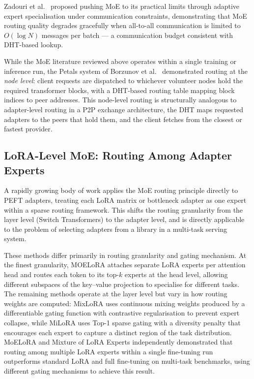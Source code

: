Zadouri et al.~\cite{ZadouriPushMoE2024} proposed pushing MoE to its practical limits through
adaptive expert specialisation under communication constraints, demonstrating that
MoE routing quality degrades gracefully when all-to-all communication is limited
to $O(\log N)$ messages per batch --- a communication budget consistent with DHT-based
lookup.

While the MoE literature reviewed above operates within a single training or inference
run, the Petals system of Borzunov et al.~\cite{Borzunov2023} demonstrated routing at the
\textit{node level}: client requests are dispatched to whichever volunteer nodes
hold the required transformer blocks, with a DHT-based routing table mapping block
indices to peer addresses. This node-level routing is structurally analogous to
adapter-level routing in a P2P exchange architecture, the DHT maps requested adapters to
the peers that hold them, and the client fetches from the closest or fastest provider.

\subsection{LoRA-Level MoE: Routing Among Adapter Experts}
\label{sec:moe_routing:lora_moe}

A rapidly growing body of work applies the MoE routing principle directly to PEFT
adapters, treating each LoRA matrix or bottleneck adapter as one expert within a
sparse routing framework. This shifts the routing granularity from the layer level
(Switch Transformers) to the adapter level, and is directly applicable to the problem
of selecting adapters from a library in a multi-task serving system.

These methods differ primarily in routing granularity and gating mechanism.
At the finest granularity, MOELoRA \cite{LiuWhenMOE2024} attaches separate LoRA experts
per attention head and routes each token to its top-$k$ experts at the head level,
allowing different subspaces of the key--value projection to specialise for different tasks.
The remaining methods operate at the layer level but vary in how routing weights are
computed: MixLoRA \cite{LiMixLoRA2024} uses continuous mixing weights produced by a
differentiable gating function with contrastive regularisation to prevent expert collapse,
while MiLoRA \cite{ZhangMiLoRA2024} uses Top-1 sparse gating with a diversity penalty
that encourages each expert to capture a distinct region of the task distribution.
MoELoRA \cite{LuoMoELoRA2024} and Mixture of LoRA Experts \cite{WuMixtureLoRA2024}
independently demonstrated that routing among multiple LoRA experts within a single
fine-tuning run outperforms standard LoRA and full fine-tuning on multi-task benchmarks,
using different gating mechanisms to achieve this result.

